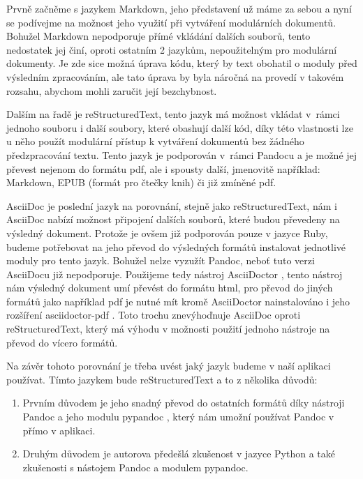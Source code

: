 Prvně začněme s jazykem Markdown, jeho představení už máme za sebou a nyní se podívejme na možnost jeho využití při vytváření modulárních dokumentů. Bohužel
Markdown nepodporuje přímé vkládání dalších souborů, tento nedostatek jej činí, oproti ostatním 2 jazykům, nepoužitelným pro modulární dokumenty. Je zde sice možná úprava
kódu, který by text obohatil o moduly před výsledním zpracováním, ale tato úprava by byla náročná na provedí v takovém rozsahu, abychom mohli zaručit její bezchybnost.

Dalším na řadě je reStructuredText, tento jazyk má možnost vkládat v~rámci jednoho souboru i další soubory, které obashují další kód, díky této vlastnosti
lze u něho použít modulární přístup k vytváření dokumentů bez žádného předzpracování textu. Tento jazyk je podporován v~rámci Pandocu \cite{pandocSW} a je možné
jej převest nejenom do formátu \gls{pdf}, ale i spousty další, jmenovitě například: Markdown, EPUB (formát pro čtečky knih) či již zmíněné \gls{pdf}.

AsciiDoc je poslední jazyk na porovnání, stejně jako reStructuredText, nám i AsciiDoc nabízí možnost připojení dalších souborů, které budou převe\-deny na výsledný dokument.
Protože je ovšem již podporován pouze v jazyce Ruby, budeme potřebovat na jeho převod do výsledných formátů instalovat jednotlivé moduly pro tento jazyk. Bohužel nelze
vyzužít Pandoc, neboť tuto verzi AsciiDocu již nepodporuje. Použijeme tedy nástroj AsciiDoctor \cite{asciiDoctorSW}, tento nástroj nám výsledný dokument umí převést do
formátu \gls{html}, pro převod do jiných formátů jako například \gls{pdf} je nutné mít kromě AsciiDoctor nainstalováno i jeho rozšíření asciidoctor-pdf \cite{asciidoctorpdfSW}.
Toto trochu znevýhoďnuje AsciiDoc oproti reStructuredText, který má výhodu v možnosti použití jednoho nástroje na převod do vícero formátů.

Na závěr tohoto porovnání je třeba uvést jaký jazyk budeme v naší aplikaci používat. Tímto jazykem bude reStructuredText a to z několika důvodů:
\begin{enumerate}
    \item Prvním důvodem je jeho snadný převod do ostatních formátů díky nástroji Pandoc \cite{pandocSW} a jeho modulu pypandoc \cite{pypandocSW}, který nám umožní používat Pandoc v přímo v aplikaci.
    \item Druhým důvodem je autorova předešlá zkušenost v jazyce Python a také zkušenosti s nástojem Pandoc a modulem pypandoc.
\end{enumerate}

